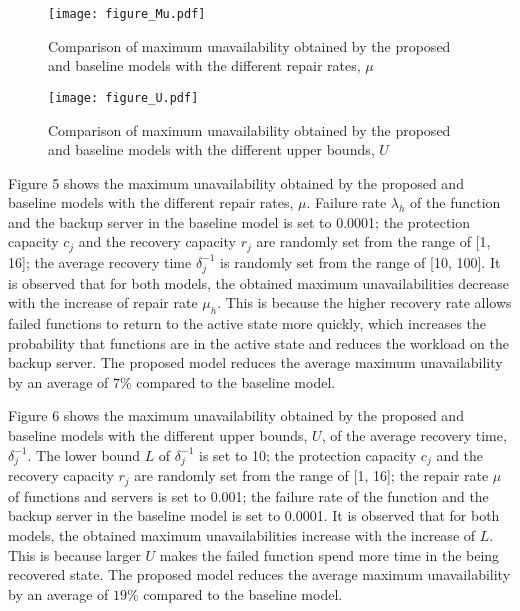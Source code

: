 \documentclass[conference]{IEEEtran}
\begin{document}
\begin{figure}[ht]
\begin{minipage}[b]{0.48\linewidth}
\centering
\texttt{[image: figure\_Mu.pdf]}
\caption{Comparison of maximum unavailability obtained by the proposed and baseline models with the different repair rates, $\mu$}
\end{minipage}
\hspace{0.1cm}
\begin{minipage}[b]{0.48\linewidth}
\centering
\texttt{[image: figure\_U.pdf]}
\caption{Comparison of maximum unavailability obtained by the proposed and baseline models with the different upper bounds, $U$}
\end{minipage}
\end{figure}

Figure 5 shows the maximum unavailability obtained by the proposed and baseline models with the different repair rates, $\mu$. Failure rate $\lambda_h$ of the function and the backup server in the baseline model is set to 0.0001; the protection capacity $c_j$ and the recovery capacity $r_j$ are randomly set from the range of [1, 16]; the average recovery time $\delta_j^{-1}$ is randomly set from the range of [10, 100]. It is observed that for both models, the obtained maximum unavailabilities decrease with the increase of repair rate $\mu_h$. This is because the higher recovery rate allows failed functions to return to the active state more quickly, which increases the probability that functions are in the active state and reduces the workload on the backup server. The proposed model reduces the average maximum unavailability by an average of $7\%$ compared to the baseline model.

Figure 6 shows the maximum unavailability obtained by the proposed and baseline models with the different upper bounds, $U$, of the average recovery time, $\delta_j^{-1}$. The lower bound $L$ of $\delta_j^{-1}$ is set to 10; the protection capacity $c_j$ and the recovery capacity $r_j$ are randomly set from the range of [1, 16]; the repair rate $\mu$ of functions and servers is set to 0.001; the failure rate of the function and the backup server in the baseline model is set to 0.0001. It is observed that for both models, the obtained maximum unavailabilities increase with the increase of $L$. This is because larger $U$ makes the failed function spend more time in the being recovered state. The proposed model reduces the average maximum unavailability by an average of $19\%$ compared to the baseline model.
\end{document}

